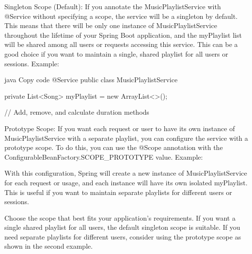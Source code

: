 Singleton Scope (Default): If you annotate the MusicPlaylistService with @Service without specifying a scope, the service will be a singleton by default. This means that there will be only one instance of MusicPlaylistService throughout the lifetime of your Spring Boot application, and the myPlaylist list will be shared among all users or requests accessing this service. This can be a good choice if you want to maintain a single, shared playlist for all users or sessions.
Example:

java
Copy code
@Service
public class MusicPlaylistService {
    private List<Song> myPlaylist = new ArrayList<>();

    // Add, remove, and calculate duration methods
}
Prototype Scope: If you want each request or user to have its own instance of MusicPlaylistService with a separate playlist, you can configure the service with a prototype scope. To do this, you can use the @Scope annotation with the ConfigurableBeanFactory.SCOPE\_PROTOTYPE value.
Example:

With this configuration, Spring will create a new instance of MusicPlaylistService for each request or usage, and each instance will have its own isolated myPlaylist. This is useful if you want to maintain separate playlists for different users or sessions.

Choose the scope that best fits your application's requirements. If you want a single shared playlist for all users, the default singleton scope is suitable. If you need separate playlists for different users, consider using the prototype scope as shown in the second example.


 
